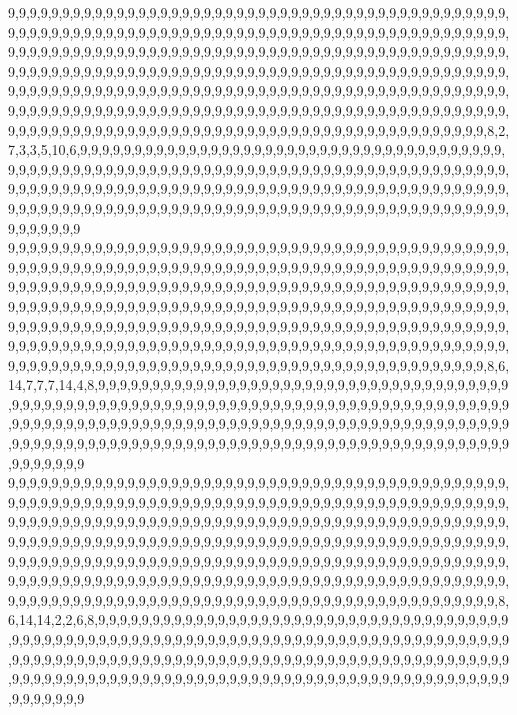 9,9,9,9,9,9,9,9,9,9,9,9,9,9,9,9,9,9,9,9,9,9,9,9,9,9,9,9,9,9,9,9,9,9,9,9,9,9,9,9,9,9,9,9,9,9,9,9,9,9,9,9,9,9,9,9,9,9,9,9,9,9,9,9,9,9,9,9,9,9,9,9,9,9,9,9,9,9,9,9,9,9,9,9,9,9,9,9,9,9,9,9,9,9,9,9,9,9,9,9,9,9,9,9,9,9,9,9,9,9,9,9,9,9,9,9,9,9,9,9,9,9,9,9,9,9,9,9,9,9,9,9,9,9,9,9,9,9,9,9,9,9,9,9,9,9,9,9,9,9,9,9,9,9,9,9,9,9,9,9,9,9,9,9,9,9,9,9,9,9,9,9,9,9,9,9,9,9,9,9,9,9,9,9,9,9,9,9,9,9,9,9,9,9,9,9,9,9,9,9,9,9,9,9,9,9,9,9,9,9,9,9,9,9,9,9,9,9,9,9,9,9,9,9,9,9,9,9,9,9,9,9,9,9,9,9,9,9,9,9,9,9,9,9,9,9,9,9,9,9,9,9,9,9,9,9,9,9,9,9,9,9,9,9,9,9,9,9,9,9,9,9,9,9,9,9,9,9,9,9,9,9,9,9,9,9,9,9,9,9,9,9,9,9,9,9,9,9,9,9,9,9,9,9,9,9,9,9,9,9,9,9,9,9,9,9,9,9,9,9,8,2,7,3,3,5,10,6,9,9,9,9,9,9,9,9,9,9,9,9,9,9,9,9,9,9,9,9,9,9,9,9,9,9,9,9,9,9,9,9,9,9,9,9,9,9,9,9,9,9,9,9,9,9,9,9,9,9,9,9,9,9,9,9,9,9,9,9,9,9,9,9,9,9,9,9,9,9,9,9,9,9,9,9,9,9,9,9,9,9,9,9,9,9,9,9,9,9,9,9,9,9,9,9,9,9,9,9,9,9,9,9,9,9,9,9,9,9,9,9,9,9,9,9,9,9,9,9,9,9,9,9,9,9,9,9,9,9,9,9,9,9,9,9,9,9,9,9,9,9,9,9,9,9,9,9,9,9,9,9,9,9,9,9,9,9,9,9,9,9,9,9,9,9,9,9,9,9,9,9,9,9,9,9,9,9,9,9,9,9,9,9
9,9,9,9,9,9,9,9,9,9,9,9,9,9,9,9,9,9,9,9,9,9,9,9,9,9,9,9,9,9,9,9,9,9,9,9,9,9,9,9,9,9,9,9,9,9,9,9,9,9,9,9,9,9,9,9,9,9,9,9,9,9,9,9,9,9,9,9,9,9,9,9,9,9,9,9,9,9,9,9,9,9,9,9,9,9,9,9,9,9,9,9,9,9,9,9,9,9,9,9,9,9,9,9,9,9,9,9,9,9,9,9,9,9,9,9,9,9,9,9,9,9,9,9,9,9,9,9,9,9,9,9,9,9,9,9,9,9,9,9,9,9,9,9,9,9,9,9,9,9,9,9,9,9,9,9,9,9,9,9,9,9,9,9,9,9,9,9,9,9,9,9,9,9,9,9,9,9,9,9,9,9,9,9,9,9,9,9,9,9,9,9,9,9,9,9,9,9,9,9,9,9,9,9,9,9,9,9,9,9,9,9,9,9,9,9,9,9,9,9,9,9,9,9,9,9,9,9,9,9,9,9,9,9,9,9,9,9,9,9,9,9,9,9,9,9,9,9,9,9,9,9,9,9,9,9,9,9,9,9,9,9,9,9,9,9,9,9,9,9,9,9,9,9,9,9,9,9,9,9,9,9,9,9,9,9,9,9,9,9,9,9,9,9,9,9,9,9,9,9,9,9,9,9,9,9,9,9,9,9,9,9,9,9,9,9,9,9,9,9,8,6,14,7,7,7,14,4,8,9,9,9,9,9,9,9,9,9,9,9,9,9,9,9,9,9,9,9,9,9,9,9,9,9,9,9,9,9,9,9,9,9,9,9,9,9,9,9,9,9,9,9,9,9,9,9,9,9,9,9,9,9,9,9,9,9,9,9,9,9,9,9,9,9,9,9,9,9,9,9,9,9,9,9,9,9,9,9,9,9,9,9,9,9,9,9,9,9,9,9,9,9,9,9,9,9,9,9,9,9,9,9,9,9,9,9,9,9,9,9,9,9,9,9,9,9,9,9,9,9,9,9,9,9,9,9,9,9,9,9,9,9,9,9,9,9,9,9,9,9,9,9,9,9,9,9,9,9,9,9,9,9,9,9,9,9,9,9,9,9,9,9,9,9,9,9,9,9,9,9,9,9,9,9,9,9,9,9,9,9,9,9
9,9,9,9,9,9,9,9,9,9,9,9,9,9,9,9,9,9,9,9,9,9,9,9,9,9,9,9,9,9,9,9,9,9,9,9,9,9,9,9,9,9,9,9,9,9,9,9,9,9,9,9,9,9,9,9,9,9,9,9,9,9,9,9,9,9,9,9,9,9,9,9,9,9,9,9,9,9,9,9,9,9,9,9,9,9,9,9,9,9,9,9,9,9,9,9,9,9,9,9,9,9,9,9,9,9,9,9,9,9,9,9,9,9,9,9,9,9,9,9,9,9,9,9,9,9,9,9,9,9,9,9,9,9,9,9,9,9,9,9,9,9,9,9,9,9,9,9,9,9,9,9,9,9,9,9,9,9,9,9,9,9,9,9,9,9,9,9,9,9,9,9,9,9,9,9,9,9,9,9,9,9,9,9,9,9,9,9,9,9,9,9,9,9,9,9,9,9,9,9,9,9,9,9,9,9,9,9,9,9,9,9,9,9,9,9,9,9,9,9,9,9,9,9,9,9,9,9,9,9,9,9,9,9,9,9,9,9,9,9,9,9,9,9,9,9,9,9,9,9,9,9,9,9,9,9,9,9,9,9,9,9,9,9,9,9,9,9,9,9,9,9,9,9,9,9,9,9,9,9,9,9,9,9,9,9,9,9,9,9,9,9,9,9,9,9,9,9,9,9,9,9,9,9,9,9,9,9,9,9,9,9,9,9,9,9,9,9,9,9,9,8,6,14,14,2,2,6,8,9,9,9,9,9,9,9,9,9,9,9,9,9,9,9,9,9,9,9,9,9,9,9,9,9,9,9,9,9,9,9,9,9,9,9,9,9,9,9,9,9,9,9,9,9,9,9,9,9,9,9,9,9,9,9,9,9,9,9,9,9,9,9,9,9,9,9,9,9,9,9,9,9,9,9,9,9,9,9,9,9,9,9,9,9,9,9,9,9,9,9,9,9,9,9,9,9,9,9,9,9,9,9,9,9,9,9,9,9,9,9,9,9,9,9,9,9,9,9,9,9,9,9,9,9,9,9,9,9,9,9,9,9,9,9,9,9,9,9,9,9,9,9,9,9,9,9,9,9,9,9,9,9,9,9,9,9,9,9,9,9,9,9,9,9,9,9,9,9,9,9,9,9,9,9,9,9,9,9,9,9,9,9
